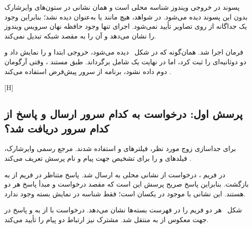 پسوند  در خروجی ویندوز شناسه  محلی است و همان نشانی در ستون‌های وایرشارک بدون
این پسوند دیده می‌شود. در شواهد، هیچ  مانند
 یا  به‌عنوان  دیده نشد؛
بنابراین وجود یک  جداگانه از روی تصاویر تأیید نمی‌شود. اجرای  تنها وجود
حافظه نهان سرویس  ویندوز را نشان می‌دهد و آن را به مقصد شبکه تبدیل نمی‌کند.

فرمان  اجرا شد. همان‌گونه که در
شکل~ دیده می‌شود، خروجی ابتدا  و
 را نمایش داد و دو  دوثانیه‌ای را ثبت کرد، اما در
نهایت یک  شامل  برگرداند.
طبق مستند ، وقتی آرگومان دوم  داده نشود، برنامه از سرور پیش‌فرض
استفاده می‌کند .

[H]

\subsection{پرسش اول: درخواست به کدام سرور ارسال و پاسخ از کدام سرور دریافت شد؟}

برای جداسازی زوج مورد نظر، فیلترهای
 و
 استفاده شدند. مرجع
رسمی وایرشارک، فیلدهای  و  را برای تشخیص جهت پیام و
نام پرسش تعریف می‌کند .

در فریم ، درخواست از نشانی محلی  به
 ارسال شد. پاسخ متناظر در فریم  از
 به  بازگشت. بنابراین پاسخ صریح
پرسش این است که مقصد درخواست و مبدأ پاسخ هر دو  هستند. این
نشانی با  موجود در  یکسان است؛ فقط شناسه 
 در نمایش بسته وجود ندارد.

شکل~ هر دو فریم را در فهرست بسته‌ها نشان می‌دهد. درخواست با
 از  به  و پاسخ در جهت معکوس از  به
 منتقل شد.  مشترک  نیز ارتباط دو
پیام را تأیید می‌کند.

